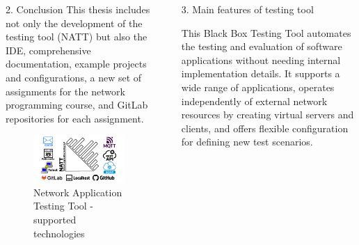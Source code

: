 \documentclass[final]{beamer}
\newlength{\sepwidth}
\newlength{\colwidth}
\newcommand{\separatorcolumn}{\begin{column}{\sepwidth}\end{column}}
\begin{document}
\begin{frame}[t]
\begin{columns}[t]
\begin{column}{\colwidth}
\begin{block}{2. Conclusion}
    \hspace{2em}This thesis includes not only the development of the testing tool (NATT) but also the IDE,
     comprehensive documentation, example projects and configurations, a new set of assignments for the 
     network programming course, and GitLab repositories for each assignment.

    \begin{figure}
      \centering
        \includegraphics[width=1.0\textwidth]{./imgs/natt-banner-tech.png}
      \caption{Network Application Testing Tool - supported technologies} 
    \end{figure}

  \end{block}

\end{column}

\separatorcolumn

\begin{column}{\colwidth}

  \begin{alertblock}{3. Main features of testing tool}

    This Black Box Testing Tool automates the testing and evaluation of software 
    applications without needing internal implementation details. It supports a 
    wide range of applications, operates independently of external network resources by 
    creating virtual servers and clients, and offers flexible configuration for 
    defining new test scenarios.


\end{alertblock}
\end{column}
\end{columns}
\end{frame}
\end{document}

